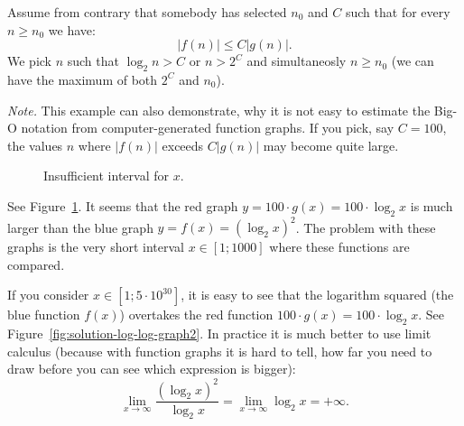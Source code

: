 \documentclass[a4paper,12pt]{article}
\begin{document}
Assume from contrary that somebody has selected $n_0$ and $C$ such 
that for every $n \geq n_0$ we have:
$$|f(n)| \leq C |g(n)|.$$
We pick $n$ such that $\log_2 n > C$ or $n > 2^C$ and simultaneosly 
$n \geq n_0$ (we can have the maximum of both $2^C$ and $n_0$). 

{\em Note.} This example can also demonstrate, why 
it is not easy to estimate the Big-O notation from computer-generated
function graphs. If you pick, say $C = 100$, 
the values $n$ where $|f(n)|$ exceeds $C|g(n)|$ 
may become quite large. 

\begin{figure}[!htb]
\caption{\label{fig:solution-log-log-graph} Insufficient interval for $x$.}
\end{figure}


See Figure~\ref{fig:solution-log-log-graph}.
It seems that the red graph $y = 100 \cdot g(x) = 100 \cdot \log_2 x$ 
is much larger than the blue graph $y = f(x) = (\log_2 x)^2$. 
The problem with these graphs is the very short interval 
$x \in [1;1000]$ where these functions 
are compared. 

If you consider $x \in \left[ 1; 5\cdot 10^{30} \right]$, it
is easy to see that the logarithm squared (the blue function $f(x)$) 
overtakes the red function $100 \cdot g(x) = 100 \cdot \log_2 x$.
See Figure~\ref{fig:solution-log-log-graph2}.
In practice it is much better to use 
limit calculus (because with function graphs it is hard to tell, how 
far you need to draw before you can see which expression is bigger):
$$\lim_{x \rightarrow \infty} \frac{(\log_2 x)^2}{\log_2 x} =
\lim_{x \rightarrow \infty} \log_2 x = +\infty.$$
\end{document}
